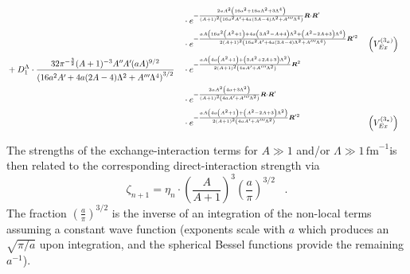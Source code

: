 \documentclass[onecolumn,preprint,superscriptaddress,nofootinbib,notitlepage,10pt,linenumbers]{revtex4-1}
\newcommand*{\mprime}{^{\prime}\mkern-1.2mu}
\newcommand*{\mdprime}{^{\prime\prime}\mkern-1.2mu}
\newcommand*{\mtprime}{^{\prime\prime\prime}\mkern-1.2mu}
\newcommand{\be}{\begin{equation}}
\newcommand{\ee}{\end{equation}}
\newcommand{\fm}{\ensuremath{\,\text{fm}^{-1}}}
\newcommand{\ve}[1]{\ensuremath{\boldsymbol{#1}}}
\begin{document}
\begin{widetext}
\begin{align*}
&&&\cdot e^{-\frac{2 a A^2 \left(16 a^2+16 a \Lambda ^2+3 \Lambda ^4\right)}{(A+1)^2 \left(16 a^2 A\mprime+4 a (3 A-4) \Lambda ^2+A\mtprime \Lambda ^4\right)}\ve{R}\cdot\ve{R}'}\\
&&&\cdot e^{-\frac{a A \left(16 a^2 \left(A^2+1\right)+4 a \left(3 A^2-A+4\right) \Lambda ^2+\left(A^2-2 A+3\right) \Lambda ^4\right)}{2 (A+1)^2 \left(16 a^2 A\mprime+4 a (3 A-4) \Lambda ^2+A\mtprime \Lambda ^4\right)}\ve{R}'^2}&&\left(V^{(3_a)}_{Ex}\right)\\
&+D_1^\Lambda\cdot
\frac{32 \pi^{-\frac{3}{2}} (A+1)^{-3} A\mdprime A\mprime (a A)^{9/2}}
{\left(16 a^2 A\mprime+4 a (2A-4) \Lambda ^2+A\mtprime \Lambda ^4\right)^{3/2}}
&&\cdot e^{-\frac{a A \left(4 a \left(A^2+1\right)+\left(5 A^2+2 A+3\right) \Lambda ^2\right)}{2 (A+1)^2 \left(4 a A\mprime+A\mtprime \Lambda ^2\right)}\ve{R}^2}\\
&&&\cdot e^{-\frac{2 a A^2 \left(4 a+3 \Lambda ^2\right)}{(A+1)^2 \left(4 a A\mprime+A\mtprime \Lambda ^2\right)}\ve{R}\cdot\ve{R}'}\\
&&&\cdot e^{-\frac{a A \left(4 a \left(A^2+1\right)+\left(A^2-2 A+3\right) \Lambda ^2\right)}{2 (A+1)^2 \left(4 a A\mprime+A\mtprime \Lambda ^2\right)}\ve{R}'^2}&&\left(V^{(3_*)}_{Ex}\right)\\
\end{align*}
\end{widetext}
%
The strengths of the exchange-interaction terms for $A\gg 1$ and/or $\Lambda\gg 1$\fm is then related to the corresponding
direct-interaction strength via
\be
\zeta_{n+1}=\eta_n\cdot\left(\frac{A}{A+1}\right)^3\left(\frac{a}{\pi}\right)^{3/2}\;\;\;.
\ee
The fraction $\left(\frac{a}{\pi}\right)^{3/2}$ is the inverse of an integration of the non-local
terms assuming a constant wave function (exponents scale with $a$ which produces an $\sqrt{\pi/a}$ upon integration,
and the spherical Bessel functions provide the remaining $a^{-1}$).
\end{document}
